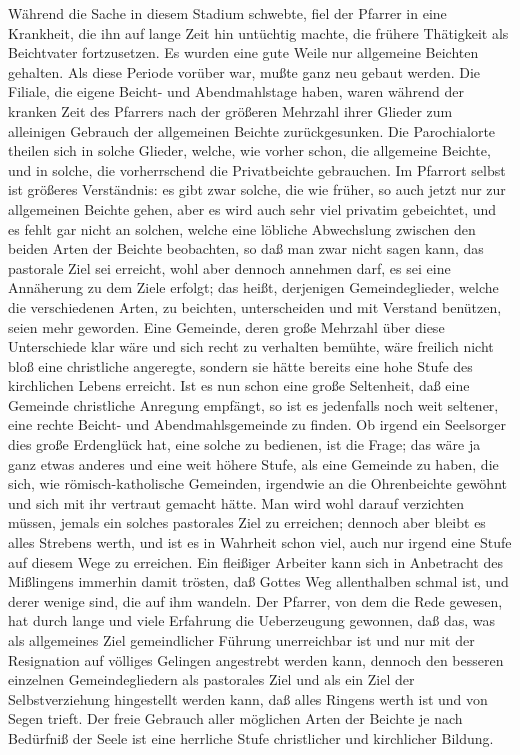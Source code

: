 Während die Sache in diesem Stadium schwebte, fiel der Pfarrer in eine Krankheit, die ihn auf lange Zeit hin untüchtig machte, die frühere Thätigkeit als Beichtvater fortzusetzen. Es wurden eine gute Weile nur allgemeine Beichten
gehalten. Als diese Periode vorüber war, mußte ganz neu gebaut werden. Die Filiale, die eigene Beicht- und Abendmahlstage haben, waren während der kranken Zeit des Pfarrers nach der größeren Mehrzahl ihrer Glieder zum alleinigen Gebrauch der allgemeinen Beichte zurückgesunken. Die Parochialorte theilen sich in solche Glieder, welche, wie vorher schon, die allgemeine Beichte, und in solche, die vorherrschend die Privatbeichte gebrauchen. Im Pfarrort selbst ist größeres Verständnis: es gibt zwar solche, die wie früher, so auch jetzt nur zur allgemeinen Beichte gehen, aber es wird auch sehr viel privatim gebeichtet, und es fehlt gar nicht an solchen, welche eine löbliche Abwechslung zwischen den beiden Arten der Beichte beobachten, so daß man zwar nicht sagen kann, das pastorale Ziel sei erreicht, wohl aber dennoch annehmen darf, es sei eine Annäherung zu dem Ziele erfolgt; das heißt, derjenigen Gemeindeglieder, welche die verschiedenen Arten, zu beichten, unterscheiden und mit Verstand benützen, seien mehr geworden. Eine Gemeinde, deren große Mehrzahl über diese Unterschiede klar wäre und sich recht zu verhalten bemühte, wäre freilich nicht bloß eine christliche angeregte, sondern sie hätte bereits eine hohe Stufe des kirchlichen Lebens erreicht. Ist es nun schon eine große Seltenheit, daß eine Gemeinde christliche Anregung empfängt, so ist es jedenfalls noch weit seltener, eine rechte Beicht- und Abendmahlsgemeinde zu finden. Ob irgend ein Seelsorger dies große Erdenglück hat, eine solche zu bedienen, ist die Frage; das wäre ja ganz etwas anderes und eine weit höhere Stufe, als eine Gemeinde zu haben, die sich, wie römisch-katholische Gemeinden, irgendwie
an die Ohrenbeichte gewöhnt und sich mit ihr vertraut gemacht hätte. Man wird wohl darauf verzichten müssen, jemals ein solches pastorales Ziel zu erreichen; dennoch aber bleibt es alles Strebens werth, und ist es in Wahrheit schon viel, auch nur irgend eine Stufe auf diesem Wege zu erreichen. Ein fleißiger Arbeiter kann sich in Anbetracht des Mißlingens immerhin damit trösten, daß Gottes Weg allenthalben schmal ist, und derer wenige sind, die auf ihm wandeln. Der Pfarrer, von dem die Rede gewesen, hat durch lange und viele Erfahrung die Ueberzeugung gewonnen, daß das, was als allgemeines Ziel gemeindlicher Führung unerreichbar ist und nur mit der Resignation auf völliges Gelingen angestrebt werden kann, dennoch den besseren einzelnen Gemeindegliedern als pastorales Ziel und als ein Ziel der Selbstverziehung hingestellt werden kann, daß alles Ringens werth ist und von Segen trieft. Der freie Gebrauch aller möglichen Arten der Beichte je nach Bedürfniß der Seele ist eine herrliche Stufe christlicher und kirchlicher Bildung.

